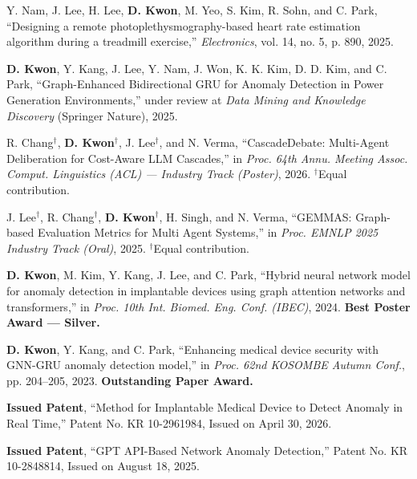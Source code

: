 \documentclass[11pt, letterpaper]{awesome-cv}
\begin{document}

\begin{cvparagraph}
Y. Nam, J. Lee, H. Lee, \textbf{D. Kwon}, M. Yeo, S. Kim, R. Sohn, and C. Park, ``Designing a remote photoplethysmography-based heart rate estimation algorithm during a treadmill exercise,'' \emph{Electronics}, vol. 14, no. 5, p. 890, 2025.

\textbf{D. Kwon}, Y. Kang, J. Lee, Y. Nam, J. Won, K. K. Kim, D. D. Kim, and C. Park, ``Graph-Enhanced Bidirectional GRU for Anomaly Detection in Power Generation Environments,'' under review at \emph{Data Mining and Knowledge Discovery} (Springer Nature), 2025.
\end{cvparagraph}

\begin{cvparagraph}
R. Chang$^{\dagger}$, \textbf{D. Kwon}$^{\dagger}$, J. Lee$^{\dagger}$, and N. Verma, ``CascadeDebate: Multi-Agent Deliberation for Cost-Aware LLM Cascades,'' in \emph{Proc. 64th Annu. Meeting Assoc. Comput. Linguistics (ACL) --- Industry Track (Poster)}, 2026. $^{\dagger}$Equal contribution.

J. Lee$^{\dagger}$, R. Chang$^{\dagger}$, \textbf{D. Kwon}$^{\dagger}$, H. Singh, and N. Verma, ``GEMMAS: Graph-based Evaluation Metrics for Multi Agent Systems,'' in \emph{Proc. EMNLP 2025 Industry Track (Oral)}, 2025. $^{\dagger}$Equal contribution.

\textbf{D. Kwon}, M. Kim, Y. Kang, J. Lee, and C. Park, ``Hybrid neural network model for anomaly detection in implantable devices using graph attention networks and transformers,'' in \emph{Proc. 10th Int. Biomed. Eng. Conf. (IBEC)}, 2024. \textbf{Best Poster Award --- Silver.}

\textbf{D. Kwon}, Y. Kang, and C. Park, ``Enhancing medical device security with GNN-GRU anomaly detection model,'' in \emph{Proc. 62nd KOSOMBE Autumn Conf.}, pp. 204--205, 2023. \textbf{Outstanding Paper Award.}
\end{cvparagraph}

\begin{cvparagraph}
\textbf{Issued Patent}, ``Method for Implantable Medical Device to Detect Anomaly in Real Time,'' Patent No. KR 10-2961984, Issued on April 30, 2026.

\textbf{Issued Patent}, ``GPT API-Based Network Anomaly Detection,'' Patent No. KR 10-2848814, Issued on August 18, 2025.
\end{cvparagraph}
\end{document}
